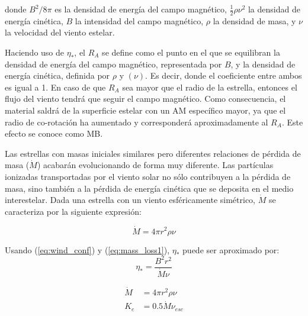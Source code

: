 donde $B^{2}/8\pi$ es la densidad de energía del campo magnético, $\frac{1}{2}\rho\nu^{2}$ la densidad de energía cinética, $B$ la intensidad del campo magnético, $\rho$ la densidad de masa, y $\nu$ la velocidad del viento estelar.\par

Haciendo uso de $\eta_*$, el $R_{A}$ se define como el punto en el que se equilibran la densidad de energía del campo magnético, representada por $B$, y la densidad de energía cinética, definida por $\rho$ y $(\nu)$. Es decir, donde el coeficiente entre ambos es igual a 1. En caso de que $R_{A}$ sea mayor que el radio de la estrella, entonces el flujo del viento tendrá que seguir el campo magnético. Como consecuencia, el material saldrá de la superficie estelar con un AM específico mayor, ya que el radio de co-rotación ha aumentado y corresponderá aproximadamente al $R_{A}$. Este efecto se conoce como MB.\par

Las estrellas con masas iniciales similares pero diferentes relaciones de pérdida de masa ($\Dot{M}$) acabarán evolucionando de forma muy diferente. Las partículas ionizadas transportadas por el viento solar no sólo contribuyen a la pérdida de masa, sino también a la pérdida de energía cinética que se deposita en el medio interestelar. Dada una estrella con un viento esféricamente simétrico, $\Dot{M}$ se caracteriza por la siguiente expresión:

\begin{equation}
    \Dot{M} = 4\pi r^2\rho\nu \label{eq:mass_loss1}
\end{equation}

Usando (\ref{eq:wind_conf}) y (\ref{eq:mass_loss1}), $\eta_*$ puede ser aproximado por: 
\begin{equation}
    \eta_* = \frac{B^{2}r^{2}}{\Dot{M}\nu} \label{eq:wind_conf2}
\end{equation}

\begin{ceqn}
\begin{align}
    \Dot{M} &= 4\pi r^2\rho\nu \label{eq:mass_loss}\\
    K_e &= 0.5\Dot{M}\nu_{esc}
\end{align}
\end{ceqn}

